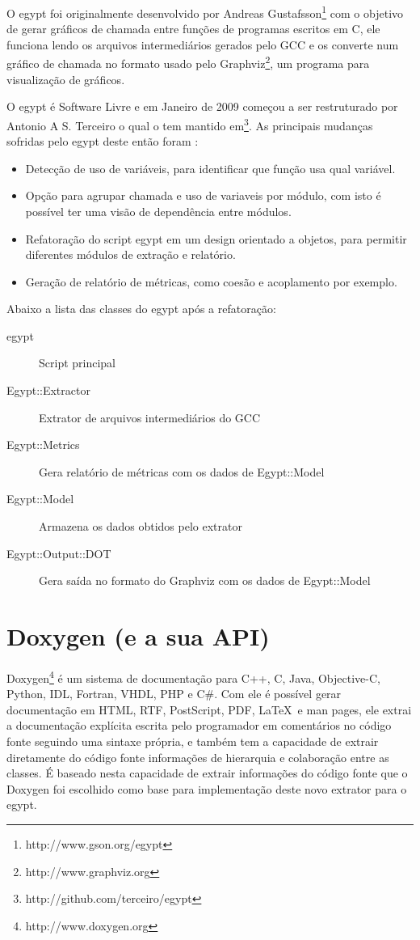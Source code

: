 O egypt foi originalmente desenvolvido por Andreas
Gustafsson\footnote{http://www.gson.org/egypt} com o objetivo de gerar gráficos
de chamada entre funções de programas escritos em C, ele funciona lendo os
arquivos intermediários gerados pelo GCC e os
converte num gráfico de chamada no formato usado pelo
Graphviz\footnote{http://www.graphviz.org}, um programa para visualização de
gráficos.

O egypt é Software Livre e em Janeiro de 2009 começou a ser restruturado por
Antonio A S. Terceiro o qual o tem mantido
em\footnote{http://github.com/terceiro/egypt}. As principais mudanças sofridas
pelo egypt deste então foram \cite{StructuralComplexityEvolution}:

\begin{itemize}
\item Detecção de uso de variáveis, para identificar que função usa qual
variável.
\item Opção para agrupar chamada e uso de variaveis por módulo, com isto é
possível ter uma visão de dependência entre módulos.
\item Refatoração do script egypt em um design orientado a objetos, para
permitir diferentes módulos de extração e relatório.
\item Geração de relatório de métricas, como coesão e acoplamento por exemplo.
\end{itemize}

Abaixo a lista das classes do egypt após a refatoração:

\begin{description}
\item[egypt] Script principal
\item[Egypt::Extractor] Extrator de arquivos intermediários do GCC
\item[Egypt::Metrics] Gera relatório de métricas com os dados de Egypt::Model
\item[Egypt::Model] Armazena os dados obtidos pelo extrator
\item[Egypt::Output::DOT] Gera saída no formato do Graphviz com os dados de Egypt::Model
\end{description}

\section{Doxygen (e a sua API)}

Doxygen\footnote{http://www.doxygen.org} é um sistema de documentação para C++,
C, Java, Objective-C, Python, IDL, Fortran, VHDL, PHP e C\#. Com ele é possível
gerar documentação em HTML, RTF, PostScript, PDF, \LaTeX\ e man pages, ele extrai a
documentação explícita escrita pelo programador em comentários no código fonte
seguindo uma sintaxe própria, e também tem a capacidade de extrair diretamente
do código fonte informações de hierarquia e colaboração entre as classes. É
baseado nesta capacidade de extrair informações do código fonte que
o Doxygen foi escolhido como base para implementação deste novo extrator para o
egypt.

